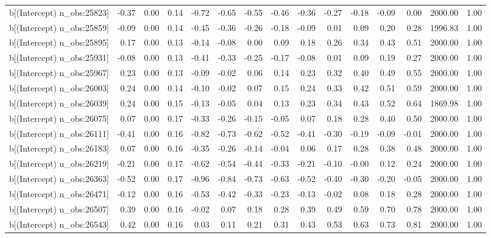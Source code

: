 \begin{table}[ht]
\begin{tabular}{rrrrrrrrrrrrrrr}
  b[(Intercept) n\_obs:25823] & -0.37 & 0.00 & 0.14 & -0.72 & -0.65 & -0.55 & -0.46 & -0.36 & -0.27 & -0.18 & -0.09 & 0.00 & 2000.00 & 1.00 \\ 
  b[(Intercept) n\_obs:25859] & -0.09 & 0.00 & 0.14 & -0.45 & -0.36 & -0.26 & -0.18 & -0.09 & 0.01 & 0.09 & 0.20 & 0.28 & 1996.83 & 1.00 \\ 
  b[(Intercept) n\_obs:25895] & 0.17 & 0.00 & 0.13 & -0.14 & -0.08 & 0.00 & 0.09 & 0.18 & 0.26 & 0.34 & 0.43 & 0.51 & 2000.00 & 1.00 \\ 
  b[(Intercept) n\_obs:25931] & -0.08 & 0.00 & 0.13 & -0.41 & -0.33 & -0.25 & -0.17 & -0.08 & 0.01 & 0.09 & 0.19 & 0.27 & 2000.00 & 1.00 \\ 
  b[(Intercept) n\_obs:25967] & 0.23 & 0.00 & 0.13 & -0.09 & -0.02 & 0.06 & 0.14 & 0.23 & 0.32 & 0.40 & 0.49 & 0.55 & 2000.00 & 1.00 \\ 
  b[(Intercept) n\_obs:26003] & 0.24 & 0.00 & 0.14 & -0.10 & -0.02 & 0.07 & 0.15 & 0.24 & 0.33 & 0.42 & 0.51 & 0.59 & 2000.00 & 1.00 \\ 
  b[(Intercept) n\_obs:26039] & 0.24 & 0.00 & 0.15 & -0.13 & -0.05 & 0.04 & 0.13 & 0.23 & 0.34 & 0.43 & 0.52 & 0.64 & 1869.98 & 1.00 \\ 
  b[(Intercept) n\_obs:26075] & 0.07 & 0.00 & 0.17 & -0.33 & -0.26 & -0.15 & -0.05 & 0.07 & 0.18 & 0.28 & 0.40 & 0.50 & 2000.00 & 1.00 \\ 
  b[(Intercept) n\_obs:26111] & -0.41 & 0.00 & 0.16 & -0.82 & -0.73 & -0.62 & -0.52 & -0.41 & -0.30 & -0.19 & -0.09 & -0.01 & 2000.00 & 1.00 \\ 
  b[(Intercept) n\_obs:26183] & 0.07 & 0.00 & 0.16 & -0.35 & -0.26 & -0.14 & -0.04 & 0.06 & 0.17 & 0.28 & 0.38 & 0.48 & 2000.00 & 1.00 \\ 
  b[(Intercept) n\_obs:26219] & -0.21 & 0.00 & 0.17 & -0.62 & -0.54 & -0.44 & -0.33 & -0.21 & -0.10 & -0.00 & 0.12 & 0.24 & 2000.00 & 1.00 \\ 
  b[(Intercept) n\_obs:26363] & -0.52 & 0.00 & 0.17 & -0.96 & -0.84 & -0.73 & -0.63 & -0.52 & -0.40 & -0.30 & -0.20 & -0.05 & 2000.00 & 1.00 \\ 
  b[(Intercept) n\_obs:26471] & -0.12 & 0.00 & 0.16 & -0.53 & -0.42 & -0.33 & -0.23 & -0.13 & -0.02 & 0.08 & 0.18 & 0.28 & 2000.00 & 1.00 \\ 
  b[(Intercept) n\_obs:26507] & 0.39 & 0.00 & 0.16 & -0.02 & 0.07 & 0.18 & 0.28 & 0.39 & 0.49 & 0.59 & 0.70 & 0.78 & 2000.00 & 1.00 \\ 
  b[(Intercept) n\_obs:26543] & 0.42 & 0.00 & 0.16 & 0.03 & 0.11 & 0.21 & 0.31 & 0.43 & 0.53 & 0.63 & 0.73 & 0.81 & 2000.00 & 1.00 \\ 

\end{tabular}
\end{table}
